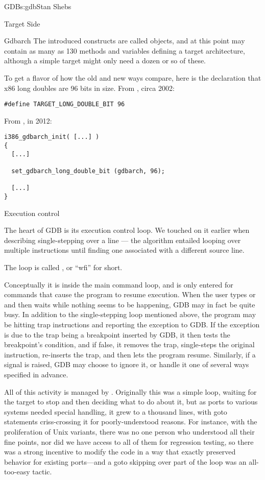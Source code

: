 \begin{aosachapter}{GDB}{s:gdb}{Stan Shebs}
\begin{aosasect1}{Target Side}
\begin{aosasect2}{Gdbarch}
The introduced constructs are called  objects, and at
this point may contain as many as 130 methods and variables defining a
target architecture, although a simple target might only need a dozen
or so of these.

To get a flavor of how the old and new ways compare, here is the
declaration that x86 long doubles are 96 bits in size.  From
, circa 2002:

\begin{verbatim}
#define TARGET_LONG_DOUBLE_BIT 96
\end{verbatim}

From , in 2012:

\begin{verbatim}
i386_gdbarch_init( [...] )
{
  [...]

  set_gdbarch_long_double_bit (gdbarch, 96);

  [...]
}
\end{verbatim}

\end{aosasect2}

\begin{aosasect2}{Execution control}

The heart of GDB is its execution control loop.  We touched on it
earlier when describing single-stepping over a line --- the algorithm
entailed looping over multiple instructions until finding one
associated with a different source line.

The loop is called , or ``wfi'' for short.

Conceptually it is inside the main command loop, and is only entered
for commands that cause the program to resume execution.  When the
user types  or  and then waits while nothing
seems to be happening, GDB may in fact be quite busy.  In addition to
the single-stepping loop mentioned above, the program may be hitting
trap instructions and reporting the exception to GDB.  If the
exception is due to the trap being a breakpoint inserted by GDB, it
then tests the breakpoint's condition, and if false, it removes the
trap, single-steps the original instruction, re-inserts the trap, and
then lets the program resume.  Similarly, if a signal is raised, GDB
may choose to ignore it, or handle it one of several ways specified in
advance.

All of this activity is managed by .
Originally this was a simple loop, waiting for the target to stop and
then deciding what to do about it, but as ports to various systems
needed special handling, it grew to a thousand lines, with goto
statements criss-crossing it for poorly-understood reasons.  For
instance, with the proliferation of Unix variants, there was no one
person who understood all their fine points, nor did we have access to
all of them for regression testing, so there was a strong incentive to
modify the code in a way that exactly preserved behavior for existing
ports---and a goto skipping over part of the loop was an all-too-easy
tactic.


\end{aosasect2}
\end{aosasect1}
\end{aosachapter}
